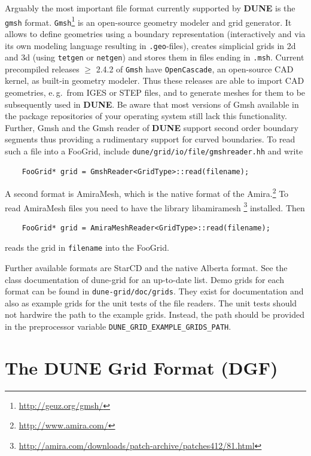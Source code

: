 \documentclass[11pt,a4paper,headinclude,footinclude,DIV16,normalheadings]{scrreprt}
\newcommand{\Dune}{{\sf\bfseries DUNE}\xspace}
\begin{document}
Arguably the most important file format currently supported by \Dune is
the \lstinline!gmsh! format.  \lstinline!Gmsh!\footnote{\url{http://geuz.org/gmsh/}}
is an open-source geometry modeler and grid generator.  It allows to define
geometries using a boundary representation (interactively and via its
own modeling language resulting in \lstinline!.geo!-files),
creates simplicial grids in 2d and 3d (using
\lstinline!tetgen! or \lstinline!netgen!)
and stores them in files ending in \lstinline!.msh!. Current precompiled
releases $\geq$ 2.4.2 of \lstinline!Gmsh! have \lstinline!OpenCascade!, an open-source CAD
kernel, as built-in geometry modeler. Thus these releases are able to import 
CAD geometries, e.\,g.~from IGES or STEP files, and to generate meshes for them to
be subsequently used in \Dune. Be aware that most versions of Gmsh available in
the package repositories of your operating system still lack this functionality.
Further, Gmsh and the Gmsh reader of \Dune support second order
boundary segments thus providing a rudimentary support for curved boundaries.
To read such a file into a FooGrid, include \lstinline!dune/grid/io/file/gmshreader.hh!
and write
\begin{lstlisting}
    FooGrid* grid = GmshReader<GridType>::read(filename);
\end{lstlisting}

A second format is AmiraMesh, which is the native format of the Amira.\footnote{\url{http://www.amira.com/}}
To read AmiraMesh files you need to have the library libamiramesh%
\footnote{\url{http://amira.com/downloads/patch-archive/patches412/81.html}}
installed.  Then
\begin{lstlisting}
    FooGrid* grid = AmiraMeshReader<GridType>::read(filename);
\end{lstlisting}
reads the grid in \lstinline!filename! into the FooGrid.

Further available formats are StarCD and the native Alberta format.
See the class documentation of dune-grid for an up-to-date list.
Demo grids for each format can be found in \lstinline!dune-grid/doc/grids!.
They exist for documentation and also as example grids for the unit
tests of the file readers.  The unit tests should not hardwire the path
to the example grids.  Instead, the path should be provided in the preprocessor
variable \lstinline!DUNE_GRID_EXAMPLE_GRIDS_PATH!.


\section{The \texorpdfstring{\Dune}{Dune} Grid Format (DGF)}
\end{document}
